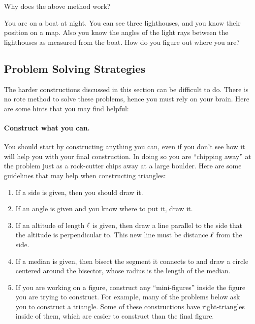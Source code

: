 \begin{question} Why does the above method work?
\end{question}
\QM

\begin{question} 
You are on a boat at night. You can see three lighthouses, and you
know their position on a map.  Also you know the angles of the light
rays between the lighthouses as measured from the boat.  How do you
figure out where you are?
\end{question}
\QM

\subsection{Problem Solving Strategies}

The harder constructions discussed in this section can be difficult to
do. There is no rote method to solve these problems, hence you must
rely on your brain. Here are some hints that you may find helpful:

\paragraph{Construct what you can.} 
You should start by constructing anything you can, even if you don't
see how it will help you with your final construction. In doing so you
are ``chipping away'' at the problem just as a rock-cutter chips away
at a large boulder. Here are some guidelines that may help when
constructing triangles:
\begin{enumerate}
\item If a side is given, then you should draw it.
\item If an angle is given and you know where to put it, draw it.
\item If an altitude of length $\ell$ is given, then draw a line
  parallel to the side that the altitude is perpendicular to. This new
  line must be distance $\ell$ from the side.
\item If a median is given, then bisect the segment it connects to and
  draw a circle centered around the bisector, whose radius is the
  length of the median.
\item If you are working on a figure, construct any ``mini-figures''
  inside the figure you are trying to construct. For example, many of
  the problems below ask you to construct a triangle. Some of these
  constructions have right-triangles inside of them, which are easier
  to construct than the final figure.
\end{enumerate}



